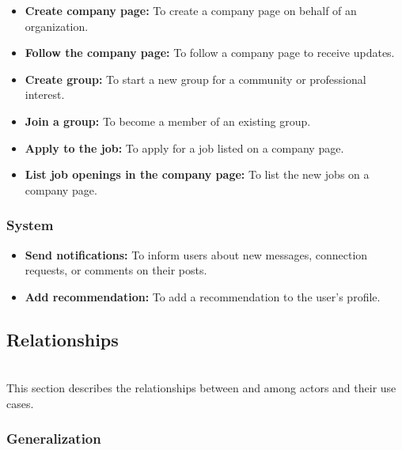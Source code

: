 \begin{itemize}
\textbf{Receive notifications:} To be notified about messages, connection requests, or comments on posts.
\item
\protect{}\label{CSV3QFeueO9zFzvId45Ob}
\textbf{Create company page:} To create a company page on behalf of an organization.
\item
\protect{}\label{5lTWUs-lxVwY0bMPg2S2p}
\textbf{Follow the company page:} To follow a company page to receive updates.
\item
\protect{}\label{YnOK_ruC-ZRK2lbbXV1i0}
\textbf{Create group:} To start a new group for a community or professional interest.
\item
\protect{}\label{ZHgt-WKOvH5oh-1fRcMV5}
\textbf{Join a group:} To become a member of an existing group.
\item
\protect{}\label{6kb4jFQbRWi4ThQOtk7GL}
\textbf{Apply to the job:} To apply for a job listed on a company page.
\item
\protect{}\label{zYY6P365sos6B0-t_Kcmw}
\textbf{List job openings in the company page:} To list the new jobs on a company page.
\end{itemize}

\subsubsection{System}\label{53WsIIVXPOnkia9mGxxd9}

\begin{itemize}
\item
\protect{}\label{K9c3_vxvcnSxmJvaKIp3P}
\textbf{Send notifications:} To inform users about new messages, connection requests, or comments on their posts.
\item
\protect{}\label{eWMBCTxeYNDLy5A8G-U_b}
\textbf{Add recommendation:} To add a recommendation to the user's profile.
\end{itemize}

\subsection{Relationships}\label{a5FCVOZ1Ew-HxFvO4TRoF}
\\
This section describes the relationships between and among actors and their use cases.

\subsubsection{Generalization}\label{kV1yv2wlucvPkdw428MtP}


